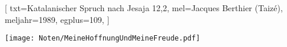 [
    txt={Katalanischer Spruch nach Jesaja 12,2}, 
    mel={Jacques Berthier (Taizé)}, 
    meljahr={1989}, 
    egplus={109},
]

\beginverse
\endverse
\texttt{[image: Noten/MeineHoffnungUndMeineFreude.pdf]}

\endsong